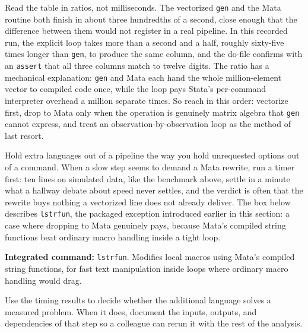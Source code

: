 \documentclass[
    a4paper,
    fontsize=10pt,
    twoside=true,
    numbers=noenddot,
]{kaobook}
\begin{document}
Read the table in ratios, not milliseconds. The vectorized \texttt{gen} and the Mata routine both finish in about three hundredths of a second, close enough that the difference between them would not register in a real pipeline. In this recorded run, the explicit loop takes more than a second and a half, roughly sixty-five times longer than \texttt{gen}, to produce the same column, and the do-file confirms with an \texttt{assert} that all three columns match to twelve digits. The ratio has a mechanical explanation: \texttt{gen} and Mata each hand the whole million-element vector to compiled code once, while the loop pays Stata's per-command interpreter overhead a million separate times. So reach in this order: vectorize first, drop to Mata only when the operation is genuinely matrix algebra that \texttt{gen} cannot express, and treat an observation-by-observation loop as the method of last resort.

Hold extra languages out of a pipeline the way you hold unrequested options out of a command. When a slow step seems to demand a Mata rewrite, run a timer first: ten lines on simulated data, like the benchmark above, settle in a minute what a hallway debate about speed never settles, and the verdict is often that the rewrite buys nothing a vectorized line does not already deliver. The box below describes \texttt{lstrfun}, the packaged exception introduced earlier in this section: a case where dropping to Mata genuinely pays, because Mata's compiled string functions beat ordinary macro handling inside a tight loop.

\begin{kaobox}[frametitle=Package Integration: \texttt{lstrfun}]
\textbf{Integrated command:} \texttt{lstrfun}. Modifies local macros using Mata's compiled string functions, for fast text manipulation inside loops where ordinary macro handling would drag.
\end{kaobox}

Use the timing results to decide whether the additional language solves a measured problem. When it does, document the inputs, outputs, and dependencies of that step so a colleague can rerun it with the rest of the analysis.
\end{document}
